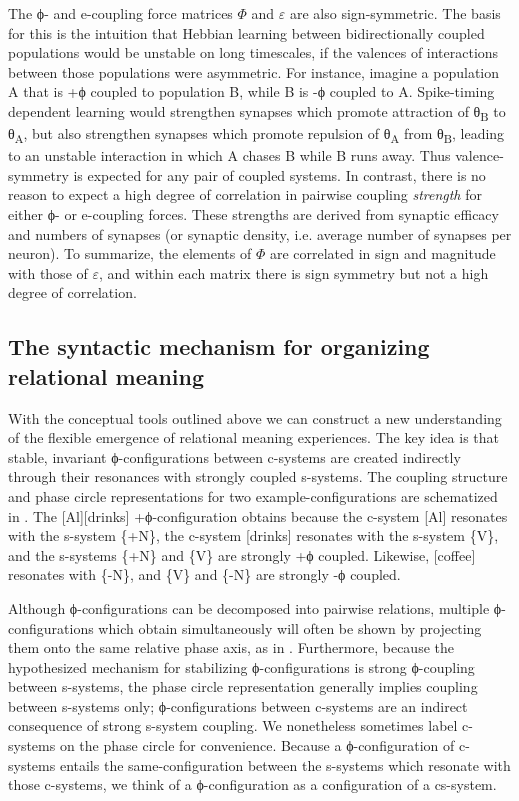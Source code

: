   The ϕ- and e-coupling force matrices $\Phi$ and $\varepsilon $ are also sign-symmetric. The basis for this is the intuition that Hebbian learning between bidirectionally coupled populations would be unstable on long timescales, if the valences of interactions between those populations were asymmetric. For instance, imagine a population A that is +ϕ coupled to population B, while B is -ϕ coupled to A. Spike-timing dependent learning would strengthen synapses which promote attraction of θ\textsubscript{B} to θ\textsubscript{A}, but also strengthen synapses which promote repulsion of θ\textsubscript{A} from θ\textsubscript{B}, leading to an unstable interaction in which A chases B while B runs away. Thus valence-symmetry is expected for any pair of coupled systems. In contrast, there is no reason to expect a high degree of correlation in pairwise coupling \textit{strength} for either ϕ- or e-coupling forces. These strengths are derived from synaptic efficacy and numbers of synapses (or synaptic density, i.e. average number of synapses per neuron). To summarize, the elements of $\Phi$ are correlated in sign and magnitude with those of $\varepsilon $, and within each matrix there is sign symmetry but not a high degree of correlation.

\subsection{The syntactic mechanism for organizing relational meaning}

With the conceptual tools outlined above we can construct a new understanding of the flexible emergence of relational meaning experiences. The key idea is that stable, invariant ϕ-configurations between c-systems are created indirectly through their resonances with strongly coupled s-systems. The coupling structure and phase circle representations for two example-configurations are schematized in {}. The [Al][drinks] +ϕ-configuration obtains because the c-system [Al] resonates with the s-system \{+N\}, the c-system [drinks] resonates with the s-system \{V\}, and the s-systems \{+N\} and \{V\} are strongly +ϕ coupled. Likewise, [coffee] resonates with \{-N\}, and \{V\} and \{-N\} are strongly -ϕ coupled.

  Although ϕ-configurations can be decomposed into pairwise relations, multiple ϕ-configurations which obtain simultaneously will often be shown by projecting them onto the same relative phase axis, as in {}. Furthermore, because the hypothesized mechanism for stabilizing ϕ-configurations is strong ϕ-coupling between s-systems, the phase circle representation generally implies coupling between s-systems only; ϕ-configurations between c-systems are an indirect consequence of strong s-system coupling. We nonetheless sometimes label c-systems on the phase circle for convenience. Because a ϕ-configuration of c-systems entails the same-configuration between the s-systems which resonate with those c-systems, we think of a ϕ-configuration as a configuration of a cs-system. 

